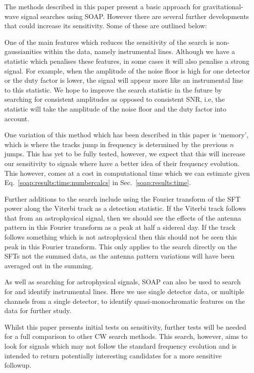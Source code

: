 %
%
The methods described in this paper present a basic approach for gravitational-wave signal searches using SOAP. However there are several further developments that could increase its sensitivity. Some of these are outlined below:

One of the main features which reduces the sensitivity of the search is non-gaussianities within the data, namely instrumental lines. Although we have a statistic which penalises these features, in some cases it will also penalise a strong signal. For example, when the amplitude of the noise floor is high for one detector or the duty factor is lower, the signal will appear more like an instrumental line to this statistic. We hope to improve the search statistic in the future by searching for consistent amplitudes as opposed to consistent \gls{SNR}, i.e, the statistic will take the amplitude of the noise floor and the duty factor into account.

One variation of this method which has been described in this paper is `memory', which is where the tracks jump in frequency is determined by the previous $n$ jumps. This has yet to be fully tested, however, we expect that this will increase our sensitivity to signals where have a better idea of their frequency evolution. This however, comes at a cost in computational time which we can estimate given Eq.~\ref{soap:results:time:numbercalcs} in Sec.~\ref{soap:results:time}.

Further additions to the search include using the Fourier transform of the \gls{SFT} power along the Viterbi track as a detection statistic.
If the Viterbi track follows that from an astrophysical signal, then we should see the effects of the antenna pattern in this Fourier transform as a peak at half a sidereal day.
If the track follows something which is not astrophysical then this should not be seen this peak in this Fourier transform.
This only applies to the search directly on the \glspl{SFT} not the summed data, as the antenna pattern variations will have been averaged out in the summing.

As well as searching for astrophysical signals, SOAP can also be used to search for and identify instrumental lines. Here we use single detector data, or multiple channels from a single detector, to identify quasi-monochromatic features on the data for further study.

Whilst this paper presents initial tests on sensitivity, further tests will be needed for a full comparison to other \gls{CW} search methods.  
This search, however, aims to look for signals which may not follow the standard
frequency evolution and is intended to return potentially interesting
candidates for a more sensitive followup.

~

